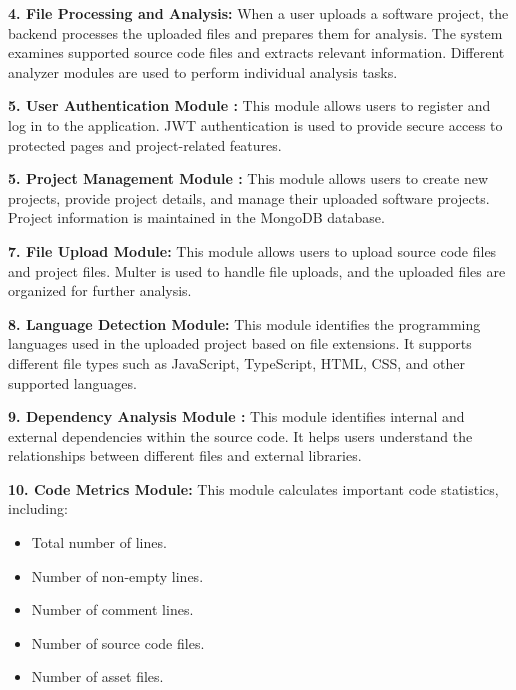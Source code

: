 \documentclass[0pt, a4 paper]{report}
\begin{document}
\begin{center}
{\vspace{2cm}
\justify \textbf{4. File Processing and Analysis:}
When a user uploads a software project, the backend processes the uploaded files and prepares them for analysis. The system examines supported source code files and extracts relevant information. Different analyzer modules are used to perform individual analysis tasks.

\justify \textbf{5. User Authentication Module :} This module allows users to register and log in to the application. JWT authentication is used to provide secure access to protected pages and project-related features.

\justify \textbf{5. Project Management Module :} This module allows users to create new projects, provide project details, and manage their uploaded software projects. Project information is maintained in the MongoDB database.

\justify \textbf{7. File Upload Module:} This module allows users to upload source code files and project files. Multer is used to handle file uploads, and the uploaded files are organized for further analysis.

\justify \textbf{8. Language Detection Module:} This module identifies the programming languages used in the uploaded project based on file extensions. It supports different file types such as JavaScript, TypeScript, HTML, CSS, and other supported languages.

\justify \textbf{9. Dependency Analysis Module :} This module identifies internal and external dependencies within the source code. It helps users understand the relationships between different files and external libraries.

\justify \textbf{10. Code Metrics Module:} This module calculates important code statistics, including:
\begin{itemize}
    \item Total number of lines.
\end{itemize}
\begin{itemize}
    \item Number of non-empty lines.
\end{itemize}
 \begin{itemize}
     \item Number of comment lines.
 \end{itemize}
 \begin{itemize}
     \item Number of source code files.
 \end{itemize}
\begin{itemize}
    \item Number of asset files.
\end{itemize}

}
\end{center}
\end{document}
